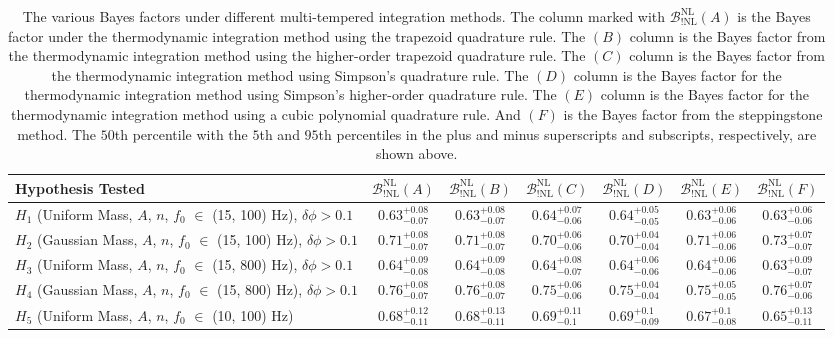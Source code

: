 \newpage

\begin{table}
\centering
\begin{tabularx}{1.0\textwidth}{l| c |c| c| c| c| c}
\hline\hline
 Hypothesis Tested  & $\mathcal{B}^{\mathrm{NL}}_{\mathrm{!NL}}(A)$  & $\mathcal{B}^{\mathrm{NL}}_{\mathrm{!NL}}(B)$ & $\mathcal{B}^{\mathrm{NL}}_{\mathrm{!NL}}(C)$ & $\mathcal{B}^{\mathrm{NL}}_{\mathrm{!NL}}(D)$ & $\mathcal{B}^{\mathrm{NL}}_{\mathrm{!NL}}(E)$ & $\mathcal{B}^{\mathrm{NL}}_{\mathrm{!NL}}(F)$\\
\hline\hline
$H_1$ (Uniform Mass, $A$, $n$, $f_0$ $\in$ (15, 100) Hz), $\delta \phi > 0.1$ &
$0.63^{+0.08}_{-0.07}$ & $0.63^{+0.08}_{-0.07}$ & $0.64^{+0.07}_{-0.06}$ & $0.64^{+0.05}_{-0.05}$ & $0.63^{+0.06}_{-0.06}$ & $0.63^{+0.06}_{-0.06}$ \\ 
\hline
$H_2$ (Gaussian Mass, $A$, $n$, $f_0$ $\in$ (15, 100) Hz), $\delta \phi > 0.1$ &
$0.71^{+0.08}_{-0.07}$ & $0.71^{+0.08}_{-0.07}$ & $0.70^{+0.06}_{-0.06}$ & $0.70^{+0.04}_{-0.04}$ & $0.71^{+0.06}_{-0.06}$ & $0.73^{+0.07}_{-0.07}$ \\ 
\hline
$H_3$ (Uniform Mass, $A$, $n$, $f_0$ $\in$ (15, 800) Hz), $\delta \phi > 0.1$ &
$0.64^{+0.09}_{-0.08}$ & $0.64^{+0.09}_{-0.08}$ & $0.64^{+0.08}_{-0.07}$ & $0.64^{+0.06}_{-0.06}$ & $0.64^{+0.06}_{-0.06}$ & $0.63^{+0.09}_{-0.07}$ \\ 
\hline
$H_4$ (Gaussian Mass, $A$, $n$, $f_0$ $\in$ (15, 800) Hz), $\delta \phi > 0.1$ &
$0.76^{+0.08}_{-0.07}$ & $0.76^{+0.08}_{-0.07}$ & $0.75^{+0.06}_{-0.06}$ & $0.75^{+0.04}_{-0.04}$ & $0.75^{+0.05}_{-0.05}$ & $0.76^{+0.07}_{-0.06}$ \\ 
\hline
$H_5$ (Uniform Mass, $A$, $n$, $f_0$ $\in$ (10, 100) Hz) &
$0.68^{+0.12}_{-0.11}$ & $0.68^{+0.13}_{-0.11}$ & $0.69^{+0.11}_{-0.1}$ & $0.69^{+0.1}_{-0.09}$ & $0.67^{+0.1}_{-0.08}$ & $0.65^{+0.13}_{-0.11}$ \\
\hline\hline
\end{tabularx}
\caption{The various Bayes factors under different multi-tempered integration methods. The column marked with $\mathcal{B}^{\mathrm{NL}}_{\mathrm{!NL}}(A)$ is the Bayes factor under the thermodynamic integration method using the trapezoid quadrature rule. The $(B)$ column is the Bayes factor from the thermodynamic integration method using the higher-order trapezoid quadrature rule. The $(C)$ column is the Bayes factor from the thermodynamic integration method using Simpson's quadrature rule. The $(D)$ column is the Bayes factor for the thermodynamic integration method using Simpson's higher-order quadrature rule. The $(E)$ column is the Bayes factor for the thermodynamic integration method using a cubic polynomial quadrature rule. And $(F)$ is the Bayes factor from the steppingstone method. The $50$th percentile with the $5$th and $95$th percentiles in the plus and minus superscripts and subscripts, respectively, are shown above.}\label{table:Bayes}
\end{table}

